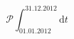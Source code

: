 \documentclass{article}
\newcommand{\dt}{\mathrm{d}t}
\begin{document}
{\Huge
\[
 \mathcal{P}\!\!\int_{01.01.2012}^{31.12.2012} \dt
\]
}
\end{document}
